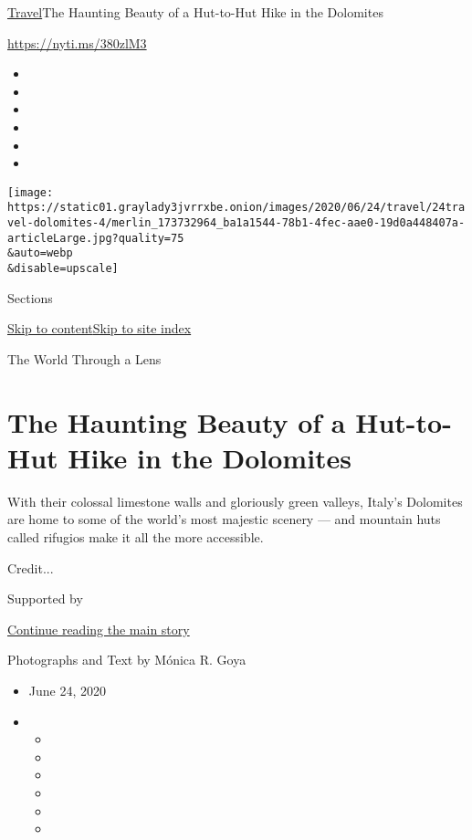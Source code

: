 \href{/section/travel}{Travel}\textbar{}The Haunting Beauty of a
Hut-to-Hut Hike in the Dolomites

\url{https://nyti.ms/380zlM3}

\begin{itemize}
\item
\item
\item
\item
\item
\item
\end{itemize}

\texttt{[image: https://static01.graylady3jvrrxbe.onion/images/2020/06/24/travel/24travel-dolomites-4/merlin\_173732964\_ba1a1544-78b1-4fec-aae0-19d0a448407a-articleLarge.jpg?quality=75\\\&auto=webp\\\&disable=upscale]}

Sections

\protect\hyperlink{site-content}{Skip to
content}\protect\hyperlink{site-index}{Skip to site index}

The World Through a Lens

\hypertarget{the-haunting-beauty-of-a-hut-to-hut-hike-in-the-dolomites}{%
\section{The Haunting Beauty of a Hut-to-Hut Hike in the
Dolomites}\label{the-haunting-beauty-of-a-hut-to-hut-hike-in-the-dolomites}}

With their colossal limestone walls and gloriously green valleys,
Italy's Dolomites are home to some of the world's most majestic scenery
--- and mountain huts called rifugios make it all the more accessible.

Credit...

Supported by

\protect\hyperlink{after-sponsor}{Continue reading the main story}

Photographs and Text by Mónica R. Goya

\begin{itemize}
\item
  June 24, 2020
\item
  \begin{itemize}
  \item
  \item
  \item
  \item
  \item
  \item
  \end{itemize}
\end{itemize}

